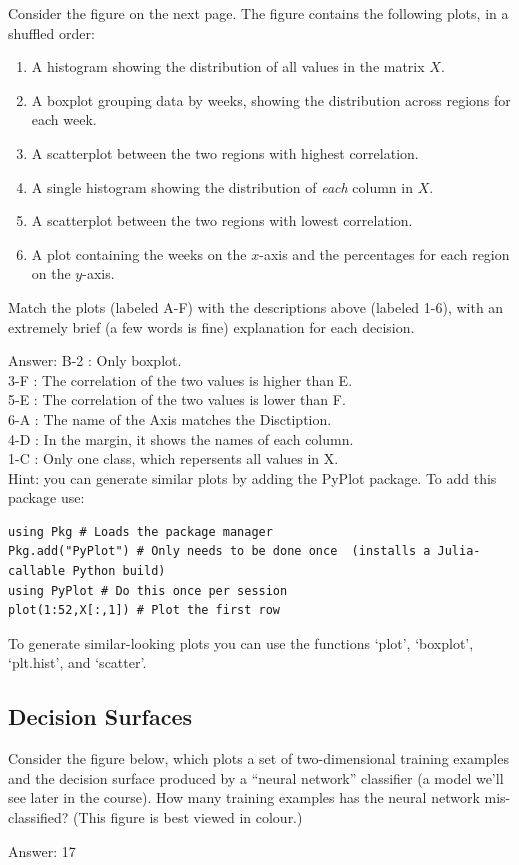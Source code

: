 \documentclass{article}
\def\ans#1{\par\gre{Answer: #1}}
\def\blu#1{{\color{blu}#1}}
\def\gre#1{{\color{gre}#1}}
\def\enum#1{\begin{enumerate}#1\end{enumerate}}
\begin{document}
Consider the figure on the next page.
The figure contains the following plots, in a shuffled order:
\enum{
\item A histogram showing the distribution of all values in the matrix $X$.
\item A boxplot grouping data by weeks, showing the distribution across regions for each week.
\item A scatterplot between the two regions with highest correlation.
\item A single histogram showing the distribution of \emph{each} column in $X$.
\item A scatterplot between the two regions with lowest correlation.
\item A plot containing the weeks on the $x$-axis and the percentages for each region on the $y$-axis.
}
\blu{Match the plots (labeled A-F) with the descriptions above (labeled 1-6), with an extremely brief (a few words is fine) explanation for each decision.}
\ans{
    B-2 : Only boxplot.\\
    3-F : The correlation of the two values is higher than E.\\
    5-E : The correlation of the two values is lower than F.\\
    6-A : The name of the Axis matches the Disctiption.\\
    4-D : In the margin, it shows the names of each column. \\
    1-C : Only one class, which repersents all values in X.\\
}
Hint: you can generate similar plots by adding the PyPlot package. To add this package use:
\begin{verbatim}
using Pkg # Loads the package manager
Pkg.add("PyPlot") # Only needs to be done once  (installs a Julia-callable Python build)
using PyPlot # Do this once per session
plot(1:52,X[:,1]) # Plot the first row
\end{verbatim}
To generate similar-looking plots you can use the functions `plot', `boxplot', `plt.hist', and `scatter'.


\subsection{Decision Surfaces}

Consider the figure below, which plots a set of two-dimensional training examples and the decision surface produced by a ``neural network'' classifier (a model we'll see later in the course).
\blu{How many training examples has the neural network mis-classified?} (This figure is best viewed in colour.)
\ans{17}
\end{document}
